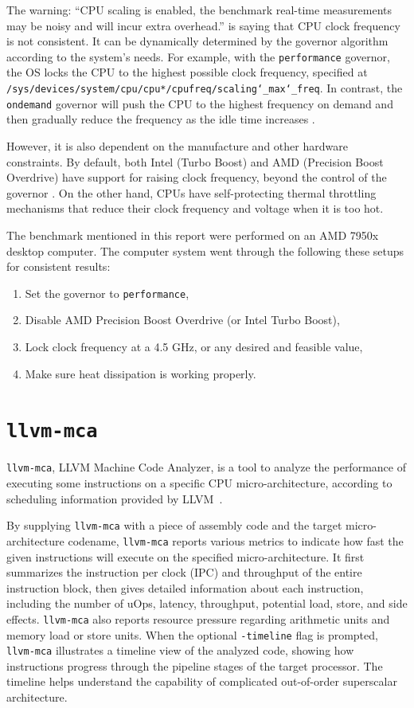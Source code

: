 \documentclass[logo,bsc,singlespacing,parskip]{infthesis}
\newcommand{\mca}{\texttt{llvm-mca}}
\newenvironment{compactlist}
{ \begin{enumerate}
    \setlength{\itemsep}{0pt}
    \setlength{\parskip}{0pt}
    \setlength{\parsep}{0pt}     
}
{ \end{enumerate} }
\begin{document}
The warning: ``CPU scaling is enabled, the benchmark real-time measurements may
be noisy and will incur extra overhead.'' is saying that CPU clock frequency is
not consistent. It can be dynamically determined by the governor algorithm
according to the system's needs. For example, with the \texttt{performance}
governor, the OS locks the CPU to the highest possible clock frequency,
specified at
\texttt{/sys/devices/system/cpu/cpu*/cpufreq/scaling\char`_max\char`_freq}. In
contrast, the \texttt{ondemand} governor will push the CPU to the highest
frequency on demand and then gradually reduce the frequency as the idle time
increases \cite{archLinuxFreqScal}.

However, it is also dependent on the manufacture and other hardware constraints.
By default, both Intel (Turbo Boost) and AMD (Precision Boost Overdrive) have
support for raising clock frequency, beyond the control of the governor
\cite{GoogleBenchReduceVariance}. On the other hand, CPUs have self-protecting
thermal throttling mechanisms that reduce their clock frequency and voltage when
it is too hot. 

The benchmark mentioned in this report were performed on an AMD 7950x desktop
computer. The computer system went through the following these setups for
consistent results:
\begin{compactlist}
    \item Set the governor to \texttt{performance}, 
    \item Disable AMD Precision Boost Overdrive (or Intel Turbo Boost), 
    \item Lock clock frequency at a 4.5 GHz, or any desired and feasible value,
    \item Make sure heat dissipation is working properly.
\end{compactlist}



\section{\mca{}}

\mca{}, LLVM Machine Code Analyzer, is a tool to analyze the performance of
executing some instructions on a specific CPU micro-architecture, according to
scheduling information provided by LLVM~\cite{llvm-mca}. 

By supplying \mca{} with a piece of assembly code and the target
micro-architecture codename, \mca{} reports various metrics to indicate how fast
the given instructions will execute on the specified micro-architecture. It
first summarizes the instruction per clock (IPC) and throughput of the entire
instruction block, then gives detailed information about each instruction,
including the number of uOps, latency, throughput, potential load, store, and side
effects. \mca{} also reports resource pressure regarding arithmetic units and
memory load or store units. When the optional \texttt{-timeline} flag is
prompted, \mca{} illustrates a timeline view of the analyzed code, showing how
instructions progress through the pipeline stages of the target processor. The
timeline helps understand the capability of complicated out-of-order superscalar
architecture. 
\end{document}
